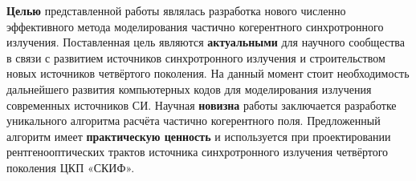\textbf{Целью} представленной работы являлась разработка нового численно эффективного метода моделирования частично когерентного синхротронного излучения. Поставленная цель являются \textbf{актуальными} для научного сообщества в связи с развитием источников синхротронного излучения и строительством новых источников четвёртого поколения. На данный момент стоит необходимость дальнейшего развития компьютерных кодов для моделирования излучения современных источников СИ. Научная \textbf{новизна} работы заключается разработке уникального алгоритма расчёта частично когерентного поля. Предложенный алгоритм имеет \textbf{практическую ценность} и используется при проектировании рентгенооптических трактов источника синхротронного излучения четвёртого поколения ЦКП «СКИФ». 


%
%




